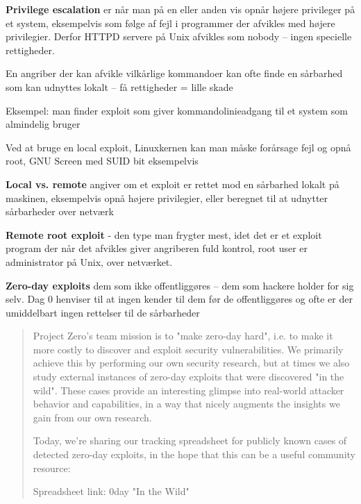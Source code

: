 \documentclass[Screen16to9,17pt]{foils}
\begin{document}
\begin{list1}
\item {\bfseries Privilege escalation} er når man på en eller anden vis
opnår højere privileger på et system, eksempelvis som
følge af fejl i programmer der afvikles med højere
privilegier. Derfor HTTPD servere på Unix afvikles som
nobody -- ingen specielle rettigheder.
\item En angriber der kan afvikle vilkårlige kommandoer kan ofte finde
  en sårbarhed som kan udnyttes lokalt -- få rettigheder = lille skade
\end{list1}

Eksempel: man finder exploit som giver kommandolinieadgang til et system
som almindelig bruger

Ved at bruge en local exploit, Linuxkernen kan man måske forårsage fejl
og opnå root, GNU Screen med SUID bit eksempelvis



\begin{list1}
\item {\bfseries Local vs. remote}
angiver om et exploit er rettet mod
en sårbarhed lokalt på maskinen, eksempelvis
opnå højere privilegier, eller beregnet
til at udnytter sårbarheder over netværk
\item {\bfseries Remote root exploit}
- den type man frygter mest, idet
det er et exploit program der når det afvikles giver
angriberen fuld kontrol, root user er administrator
på Unix, over netværket.
\item {\bfseries Zero-day exploits} dem som ikke offentliggøres -- dem
  som hackere holder for sig selv. Dag 0 henviser til at ingen kender
  til dem før de offentliggøres og ofte er der umiddelbart ingen
  rettelser til de sårbarheder
\end{list1}




\begin{quote}

  Project Zero's team mission is to "make zero-day hard", i.e. to make it more costly to discover and exploit security vulnerabilities. We primarily achieve this by performing our own security research, but at times we also study external instances of zero-day exploits that were discovered "in the wild". These cases provide an interesting glimpse into real-world attacker behavior and capabilities, in a way that nicely augments the insights we gain from our own research.

  Today, we're sharing our tracking spreadsheet for publicly known cases of detected zero-day exploits, in the hope that this can be a useful community resource:

  Spreadsheet link: 0day "In the Wild"\\
\end{quote}
\end{document}
